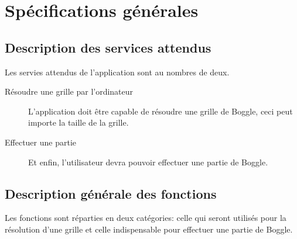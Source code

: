 \documentclass[12pt,a4paper,openany]{article}
\begin{document}
	\section{Spécifications générales}
	\subsection{Description des services attendus}
	Les servies attendus de l'application sont au nombres de deux.
		\begin{description}
			\item[Résoudre une grille par l'ordinateur] L'application doit être capable de résoudre une grille de Boggle, ceci peut importe la taille de
				la grille.
			\item[Effectuer une partie]  Et enfin, l'utilisateur devra pouvoir effectuer une partie de Boggle.
		\end{description}
	\subsection{Description générale des fonctions}
	Les fonctions sont réparties en deux catégories: celle qui seront utilisés pour la résolution d'une grille et celle indispensable pour effectuer
	une partie de Boggle.
\end{document}
